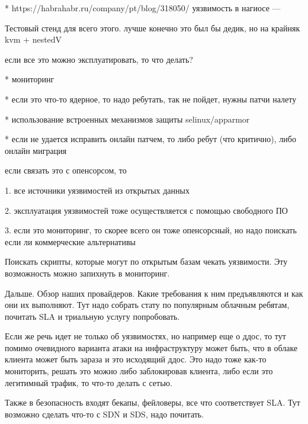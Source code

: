 * https://habrahabr.ru/company/pt/blog/318050/ уязвимость в нагиосе
---

Тестовый стенд для всего этого.
лучше конечно это был бы дедик, но на крайняк kvm + nestedV

если все это можно эксплуатировать, то что делать?

* мониторинг

* если это что-то ядерное, то надо ребутать, так не пойдет, нужны патчи налету

* использование встроенных механизмов защиты selinux/apparmor

* если не удается исправить онлайн патчем, то либо ребут (что критично), либо онлайн миграция


если связать это с опенсорсом, то

1. все источники уязвимостей из открытых данных

2. эксплуатация уязвимостей тоже осуществляется с помощью свободного ПО

3. если это мониторинг, то скорее всего он тоже опенсорсный, но надо поискать если ли коммерческие альтернативы

Поискать скрипты, которые могут по открытым базам чекать уязвимости.
Эту возможность можно запихнуть в мониторинг.


Дальше.
Обзор наших провайдеров.
Какие требования к ним предъявляются и как они их выполняют.
Тут надо собрать стату по популярным облачным ребятам, почитать SLA и триальную услугу попробовать.

Если же речь идет не только об уязвимостях, но например еще о ддос, то тут помимо очевидного варианта атаки на инфраструктуру может быть, что в облаке клиента может быть зараза и это исходящий ддос.
Это надо тоже как-то мониторить, решать это можно либо заблокировав клиента, либо если это легитимный трафик, то что-то делать с сетью.

Также в безопасность входят бекапы, фейловеры, все что соответствует SLA.
Тут возможно сделать что-то с SDN и SDS, надо почитать.


